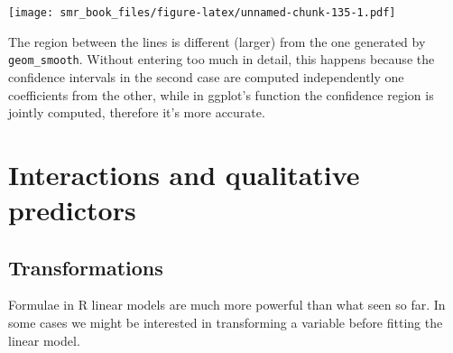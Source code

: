 \documentclass[
  oneside]{book}
\newenvironment{Shaded}{\begin{snugshade}}{\end{snugshade}}
\newcommand{\AttributeTok}[1]{\textcolor[rgb]{0.77,0.63,0.00}{#1}}
\newcommand{\CommentTok}[1]{\textcolor[rgb]{0.56,0.35,0.01}{\textit{#1}}}
\newcommand{\DecValTok}[1]{\textcolor[rgb]{0.00,0.00,0.81}{#1}}
\newcommand{\FunctionTok}[1]{\textcolor[rgb]{0.00,0.00,0.00}{#1}}
\newcommand{\NormalTok}[1]{#1}
\newcommand{\SpecialCharTok}[1]{\textcolor[rgb]{0.00,0.00,0.00}{#1}}
\begin{document}
\begin{Shaded}
\end{Shaded}

\texttt{[image: smr\_book\_files/figure-latex/unnamed-chunk-135-1.pdf]}

The region between the lines is different (larger) from the one generated by
\texttt{geom\_smooth}. Without entering too much in detail, this happens because the
confidence intervals in the second case are computed independently one
coefficients from the other, while in ggplot's function the confidence region
is jointly computed, therefore it's more accurate.

\hypertarget{interactions-and-qualitative-predictors}{%
\chapter{Interactions and qualitative predictors}\label{interactions-and-qualitative-predictors}}

\hypertarget{transformations}{%
\section{Transformations}\label{transformations}}

Formulae in R linear models are much more powerful than
what seen so far. In some cases we might be interested in
transforming a variable before fitting the linear model.
\end{document}
